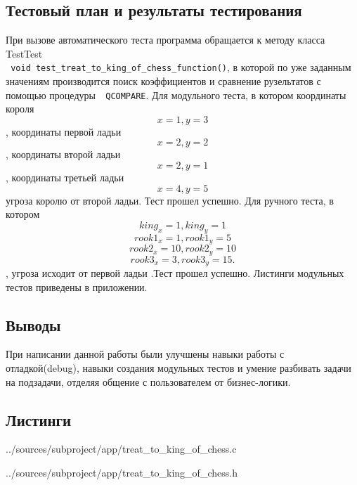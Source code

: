 \documentclass[12pt,a4paper]{report}
\begin{document}
\subsection{Тестовый план и результаты тестирования}
При вызове автоматического теста программа обращается к методу класса TestTest \\ \verb+ void test_treat_to_king_of_chess_function()+, в которой по уже заданным значениям производится поиск коэффициентов и сравнение рузельтатов с помощью процедуры\verb+  QCOMPARE+.
Для модульного теста, в котором координаты короля 
\begin{equation}
x=1,y=3
\end{equation},
координаты первой ладьи
\begin{equation}
x=2,y=2
\end{equation} ,
координаты второй ладьи
\begin{equation}
x=2,y=1
\end{equation},
координаты третьей ладьи
\begin{equation}
x=4,y=5
\end{equation}
угроза королю от второй ладьи. Тест прошел успешно.
Для ручного теста, в котором \begin{equation}king_x=1, king_y=1\end{equation} \begin{equation}rook1_x=1, rook1_y=5 \end{equation} \begin{equation}rook2_x=10, rook2_y=10 \end{equation} \begin{equation} rook3_x=3, rook3_y=15.\end{equation}, угроза исходит от первой ладьи .Тест прошел успешно.
Листинги модульных тестов приведены в приложении.

\subsection{Выводы}
При написании данной работы были улучшены навыки работы с отладкой(debug), навыки создания модульных тестов и умение разбивать задачи на подзадачи, отделяя общение с пользователем от бизнес-логики.
\subsection*{Листинги}


{../sources/subproject/app/treat_to_king_of_chess.c}


{../sources/subproject/app/treat_to_king_of_chess.h}
\end{document}
